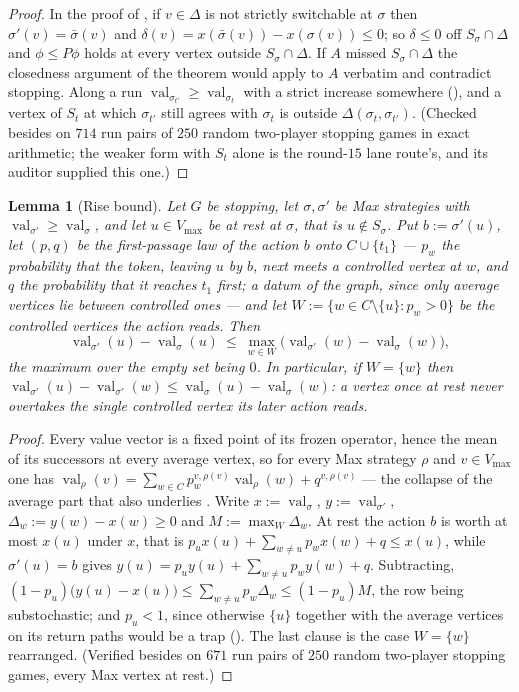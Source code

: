\documentclass[11pt]{article}
\theoremstyle{plain}
\newtheorem{lemma}[theorem]{Lemma}
\theoremstyle{definition}
\DeclareMathOperator{\val}{val}
\newcommand{\Vmax}{V_{\max}}
\begin{document}
\begin{proof}
In the proof of , if $v\in\Delta$ is not strictly
switchable at $\sigma$ then $\sigma'(v)=\bar\sigma(v)$ and
$\delta(v)=x(\bar\sigma(v))-x(\sigma(v))\le0$; so $\delta\le0$ off
$S_\sigma\cap\Delta$ and $\phi\le P\phi$ holds at every vertex outside
$S_\sigma\cap\Delta$. If $A$ missed $S_\sigma\cap\Delta$ the closedness
argument of the theorem would apply to $A$ verbatim and contradict
stopping. Along a run $\val_{\sigma_{t'}}\ge\val_{\sigma_t}$ with a strict
increase somewhere (), and a vertex of $S_t$ at which
$\sigma_{t'}$ still agrees with $\sigma_t$ is outside
$\Delta(\sigma_t,\sigma_{t'})$. (Checked besides on $714$ run pairs of
$250$ random two-player stopping games in exact arithmetic; the weaker
form with $S_t$ alone is the round-$15$ lane route's, and its auditor
supplied this one.)
\end{proof}

\begin{lemma}[Rise bound]\label{lem:rise-bound}
Let $G$ be stopping, let $\sigma,\sigma'$ be Max strategies with
$\val_{\sigma'}\ge\val_\sigma$, and let $u\in\Vmax$ be at rest at
$\sigma$, that is $u\notin S_\sigma$. Put $b:=\sigma'(u)$, let $(p,q)$ be
the first-passage law of the action $b$ onto $C\cup\{t_1\}$ --- $p_w$ the
probability that the token, leaving $u$ by $b$, next meets a controlled
vertex at $w$, and $q$ the probability that it reaches $t_1$ first; a
datum of the graph, since only average vertices lie between controlled
ones --- and let $W:=\{w\in C\setminus\{u\}:p_w>0\}$ be the controlled
vertices the action reads. Then
\[
  \val_{\sigma'}(u)-\val_\sigma(u)\ \le\ \max_{w\in W}\bigl(\val_{\sigma'}(w)-\val_\sigma(w)\bigr),
\]
the maximum over the empty set being $0$. In particular, if $W=\{w\}$ then
$\val_{\sigma'}(u)-\val_{\sigma'}(w)\le\val_\sigma(u)-\val_\sigma(w)$: a
vertex once at rest never overtakes the single controlled vertex its
later action reads.
\end{lemma}

\begin{proof}
Every value vector is a fixed point of its frozen operator, hence the mean
of its successors at every average vertex, so for every Max strategy
$\rho$ and $v\in\Vmax$ one has
$\val_\rho(v)=\sum_{w\in C}p^{v,\rho(v)}_w\val_\rho(w)+q^{v,\rho(v)}$ ---
the collapse of the average part that also underlies .
Write $x:=\val_\sigma$, $y:=\val_{\sigma'}$, $\Delta_w:=y(w)-x(w)\ge0$ and
$M:=\max_W\Delta_w$. At rest the action $b$ is worth at most $x(u)$ under
$x$, that is $p_ux(u)+\sum_{w\ne u}p_wx(w)+q\le x(u)$, while
$\sigma'(u)=b$ gives $y(u)=p_uy(u)+\sum_{w\ne u}p_wy(w)+q$. Subtracting,
$(1-p_u)\bigl(y(u)-x(u)\bigr)\le\sum_{w\ne u}p_w\Delta_w\le(1-p_u)M$,
the row being substochastic; and $p_u<1$, since otherwise $\{u\}$
together with the average vertices on its return paths would be a trap
(). The last clause is the case $W=\{w\}$ rearranged.
(Verified besides on $671$ run pairs of $250$ random two-player stopping
games, every Max vertex at rest.)
\end{proof}
\end{document}
